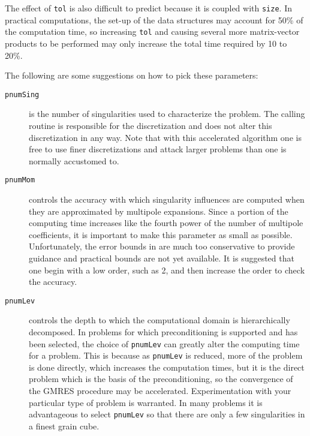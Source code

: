 The effect of {\tt tol} is also difficult to predict because it is 
coupled with {\tt size}.  In practical computations, the set-up of the
data structures may account for 50\% of the computation time, so 
increasing {\tt tol} and causing several more matrix-vector products
to be performed may only increase the total time required by 10 to 
20\%.  

\noindent
The following are some suggestions on how to pick these parameters:

\begin{description}
\item[{\tt *pnumSing}] is the number of singularities used to characterize 
the problem.  The calling routine is responsible for the 
discretization and \fas does not alter this discretization in any way.
Note that with this accelerated algorithm one is free to use finer 
discretizations and attack larger problems than one is normally accustomed to.

\item[{\tt *pnumMom}] controls the accuracy with which singularity 
influences are computed when they are approximated by multipole expansions.  
Since a portion of the computing time increases like the fourth power
of the number of multipole coefficients, it is important to make
this parameter as small as possible.  Unfortunately, the 
error bounds in \cite{greeng87} are much too conservative
to provide guidance and practical bounds are not yet available.  It is
suggested that one begin with a low order, such as 2, and then 
increase the order to check the accuracy.

\item[{\tt *pnumLev}] controls the depth to which the computational 
domain is hierarchically decomposed.   In problems for which 
preconditioning is supported and has been selected, the choice
of {\tt *pnumLev} can greatly alter the computing time for 
a problem.  This is because as  {\tt *pnumLev} is reduced, more
of the problem is done directly, which increases the computation 
times, but it is the direct problem which is the basis of the 
preconditioning, so the convergence of the GMRES procedure
may be accelerated.  Experimentation with your particular type
of problem is warranted.  In many problems it is advantageous to 
select  {\tt *pnumLev} so that there are only a few singularities in
a finest grain cube.


\end{description}
